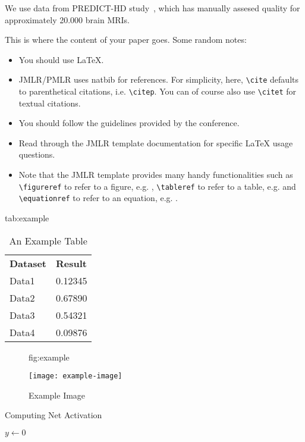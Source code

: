 \documentclass{midl} %
\begin{document}
We use data from PREDICT-HD study~\cite{paulsen2014clinical}, which has manually assesed quality for approximately 20.000 brain MRIs.

This is where the content of your paper goes.  Some random notes:
\begin{itemize}
\item You should use \LaTeX \cite{Lamport:Book:1989}.
\item JMLR/PMLR uses natbib for references. For simplicity, here, \verb|\cite|  defaults to
  parenthetical citations, i.e. \verb|\citep|. You can of course also
  use \verb|\citet| for textual citations.
\item You should follow the guidelines provided by the conference.
\item Read through the JMLR template documentation for specific \LaTeX
  usage questions.
\item Note that the JMLR template provides many handy functionalities
such as \verb|\figureref| to refer to a figure,
e.g. ,  \verb|\tableref| to refer to a table,
e.g.  and \verb|\equationref| to refer to an equation,
e.g. .
\end{itemize}

\begin{table}[htbp]
\floatconts
  {tab:example}%
  {\caption{An Example Table}}%
  {\begin{tabular}{ll}
  \bfseries Dataset & \bfseries Result\\
  Data1 & 0.12345\\
  Data2 & 0.67890\\
  Data3 & 0.54321\\
  Data4 & 0.09876
  \end{tabular}}
\end{table}

\begin{figure}[htbp]
\floatconts
  {fig:example}
  {\caption{Example Image}}
  {\texttt{[image: example-image]}}
\end{figure}

\begin{algorithm2e}
\caption{Computing Net Activation}
\label{alg:net}
{}
$y\leftarrow 0$\;
\end{algorithm2e}



\end{document}
